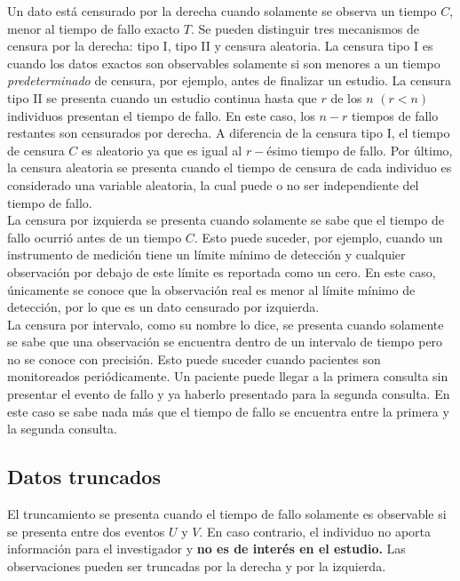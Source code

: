 \documentclass[11pt,a4paper]{article}
\begin{document}
Un dato está censurado por la derecha cuando solamente se observa un tiempo $C$, menor al tiempo de fallo exacto $T$. Se pueden distinguir tres mecanismos de censura por la derecha: tipo I, tipo II y censura aleatoria. La censura tipo I es cuando los datos exactos son observables solamente si son menores a un tiempo \textit{predeterminado} de censura, por ejemplo, antes de finalizar un estudio. La censura tipo II se presenta cuando un estudio continua hasta que $r$ de los $n$ $(r<n)$ individuos presentan el tiempo de fallo. En este caso, los $n-r$ tiempos de fallo restantes son censurados por derecha. A diferencia de la censura tipo I, el tiempo de censura $C$ es aleatorio ya que es igual al $r-$ésimo tiempo de fallo. Por último, la censura aleatoria se presenta cuando el tiempo de censura de cada individuo es considerado una variable aleatoria, la cual puede o no ser independiente del tiempo de fallo.\\

La censura por izquierda se presenta cuando solamente se sabe que el tiempo de fallo ocurrió antes de un tiempo $C$. Esto puede suceder, por ejemplo, cuando un instrumento de medición tiene un límite mínimo de detección y cualquier observación por debajo de este límite es reportada como un cero. En este caso, únicamente se conoce que la observación real es menor al límite mínimo de detección, por lo que es un dato censurado por izquierda.\\

La censura por intervalo, como su nombre lo dice, se presenta cuando solamente se sabe que una observación se encuentra dentro de un intervalo de tiempo pero no se conoce con precisión. Esto puede suceder cuando pacientes son monitoreados periódicamente. Un paciente puede llegar a la primera consulta sin presentar el evento de fallo y ya haberlo presentado para la segunda consulta. En este caso se sabe nada más que el tiempo de fallo se encuentra entre la primera y la segunda consulta.\\ 

\subsection{Datos truncados}
\label{sec:truncados}

El truncamiento se presenta cuando el tiempo de fallo solamente es observable si se presenta entre dos eventos $U$ y $V$. En caso contrario, el individuo no aporta información para el investigador y \textbf{no es de interés en el estudio.} Las observaciones pueden ser truncadas por la derecha y por la izquierda.\\
\end{document}
